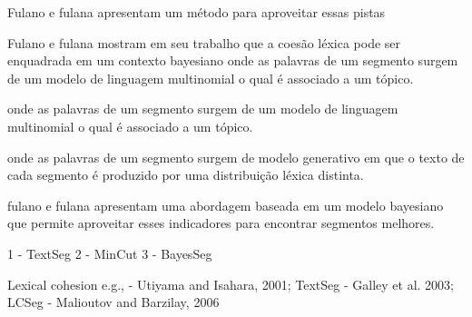 
Fulano e fulana apresentam um método para aproveitar essas pistas





Fulano e fulana mostram em seu trabalho que a coesão léxica pode ser enquadrada em um contexto bayesiano onde as palavras de um segmento surgem de um modelo de linguagem multinomial o qual é associado a um tópico.


onde as palavras de um segmento surgem de um modelo de linguagem multinomial o qual é associado a um tópico.

onde as palavras de um segmento surgem de modelo generativo em que o texto de cada segmento é produzido por uma distribuição léxica distinta. 



















fulano e fulana apresentam uma abordagem baseada em um modelo bayesiano que permite aproveitar esses indicadores para encontrar segmentos melhores.







1 - TextSeg
2 - MinCut
3 - BayesSeg


Lexical cohesion e.g., 
	- Utiyama and Isahara,     2001; {TextSeg}
	- Galley et al.            2003; {LCSeg}
	- Malioutov and Barzilay,  2006  {}






